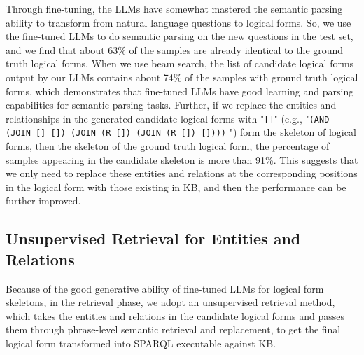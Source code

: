 \documentclass{article} \usepackage{iclr2024_conference,times}
\begin{document}
Through fine-tuning, the LLMs have somewhat mastered the semantic parsing ability to transform from natural language questions to logical forms. So, we use the fine-tuned LLMs to do semantic parsing on the new questions in the test set, and we find that about 63\% of the samples are already identical to the ground truth logical forms. When we use beam search, the list of candidate logical forms  output by our LLMs contains about 74\% of the samples with ground truth logical forms, which demonstrates that fine-tuned LLMs have good learning and parsing capabilities for semantic parsing tasks. Further, if we replace the entities and relationships in the generated candidate logical forms with "\texttt{[]}" (e.g., "\texttt{(AND (JOIN [] []) (JOIN (R []) (JOIN (R []) [])))} ") form the skeleton of logical forms, then the skeleton of the ground truth logical form, the percentage of samples appearing in the candidate skeleton is more than 91\%. This suggests that we only need to replace these entities and relations at the corresponding positions in the logical form with those existing in KB, and then the performance can be further improved.

\subsection{Unsupervised Retrieval for Entities and Relations}

Because of the good generative ability of fine-tuned LLMs for logical form skeletons, in the retrieval phase, we adopt an unsupervised retrieval method, which takes the entities and relations in the candidate logical forms and passes them through phrase-level semantic retrieval and replacement, to get the final logical form transformed into SPARQL executable against KB.
\end{document}
